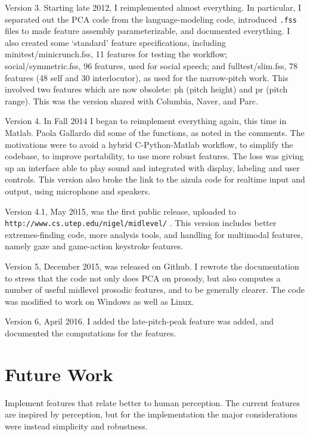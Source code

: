 \documentclass[11pt]{article}
\begin{document}
Version 3. Starting late 2012, I reimplemented almost everything.  In
particular, I separated out the PCA code from the language-modeling
code, introduced {\tt .fss} files to made feature assembly
parameterizable, and documented everything.  I also created some
`standard' feature specifications, including minitest/minicrunch.fss,
11 features for testing the workflow; social/symmetric.fss, 96
features, used for social speech; and fulltest/slim.fss, 78 features
(48 self and 30 interlocutor), as used for the narrow-pitch work.
This involved two features which are now obsolete: ph (pitch height)
and pr (pitch range).  This was the version shared with Columbia,
Naver, and Parc.

Version 4.  In Fall 2014 I began to reimplement everything again, this
time in Matlab.  Paola Gallardo did some of the functions, as noted in
the comments.  The motivations were to avoid a hybrid C-Python-Matlab
workflow, to simplify the codebase, to improve portability, to use
more robust features.  The loss was giving up an interface able to
play sound and integrated with display, labeling and user controls.
This version also broke the link to the aizula code for realtime input
and output, using microphone and speakers.

Version 4.1, May 2015, was the first public release, uploaded to {\tt
  http://www.cs.utep.edu/nigel/midlevel/} .  This version includes
better extremes-finding code, more analysis tools, and handling for
multimodal features, namely gaze and game-action keystroke features.

Version 5, December 2015, was released on Github.  I rewrote the
documentation to stress that the code not only does PCA on prosody,
but also computes a number of useful midlevel prosodic features, and
to be generally clearer.  The code was modified to work on Windows as
well as Linux.  

Version 6, April 2016.  I added the late-pitch-peak feature was added, and
documented the computations for the features.


\section{Future Work}

Implement features that relate better to human perception.  The
current features are inspired by perception, but for the
implementation the major considerations were instead simplicity and
robustness.
\end{document}
